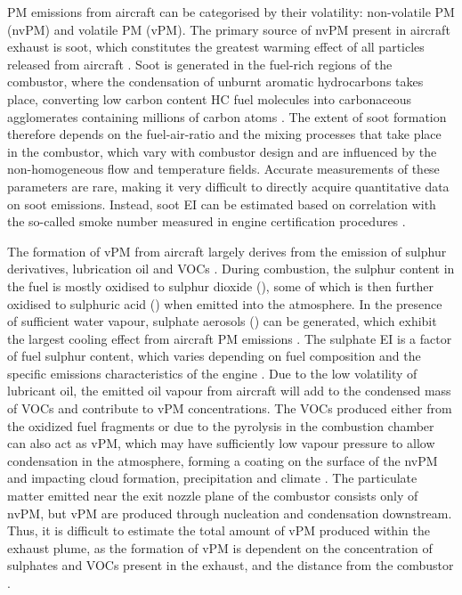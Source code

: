 PM emissions from aircraft can be categorised by their volatility: non-volatile PM (nvPM) and volatile PM (vPM). The primary source of nvPM present in aircraft exhaust is soot, which constitutes the greatest warming effect of all particles released from aircraft \cite{Gettelman2013}. Soot is generated in the fuel-rich regions of the combustor, where the condensation of unburnt aromatic hydrocarbons takes place, converting low carbon content HC fuel molecules into carbonaceous agglomerates containing millions of carbon atoms \cite{Ebbinghaus2001, Bockhorn1994}. The extent of soot formation therefore depends on the fuel-air-ratio and the mixing processes that take place in the combustor, which vary with combustor design and are influenced by the non-homogeneous flow and temperature fields. Accurate measurements of these parameters are rare, making it very difficult to directly acquire quantitative data on soot emissions. Instead, soot EI can be estimated based on correlation with the so-called smoke number measured in engine certification procedures \cite{Dopelheuer1998}.

The formation of vPM from aircraft largely derives from the emission of sulphur derivatives, lubrication oil and VOCs \cite{Wayson2012}. During combustion, the sulphur content in the fuel is mostly oxidised to sulphur dioxide (), some of which is then further oxidised to sulphuric acid () when emitted into the atmosphere. In the presence of sufficient water vapour, sulphate aerosols () can be generated, which exhibit the largest cooling effect from aircraft PM emissions \cite{IPCC1999}. The sulphate EI is a factor of fuel sulphur content, which varies depending on fuel composition and the specific emissions characteristics of the engine \cite{Schumann2002}. Due to the low volatility of lubricant oil, the emitted oil vapour from aircraft will add to the condensed mass of VOCs and contribute to vPM concentrations. The VOCs produced either from the oxidized fuel fragments or due to the pyrolysis in the combustion chamber can also act as vPM, which may have sufficiently low vapour pressure to allow condensation in the atmosphere, forming a coating on the surface of the nvPM and impacting cloud formation, precipitation and climate \cite{IPCC1999}. The particulate matter emitted near the exit nozzle plane of the combustor consists only of nvPM, but vPM are produced through nucleation and condensation downstream. Thus,  it is difficult to estimate the total amount of vPM produced within the exhaust plume, as the formation of vPM is dependent on the concentration of sulphates and VOCs present in the exhaust, and the distance from the combustor \cite{Masiol2014}.

